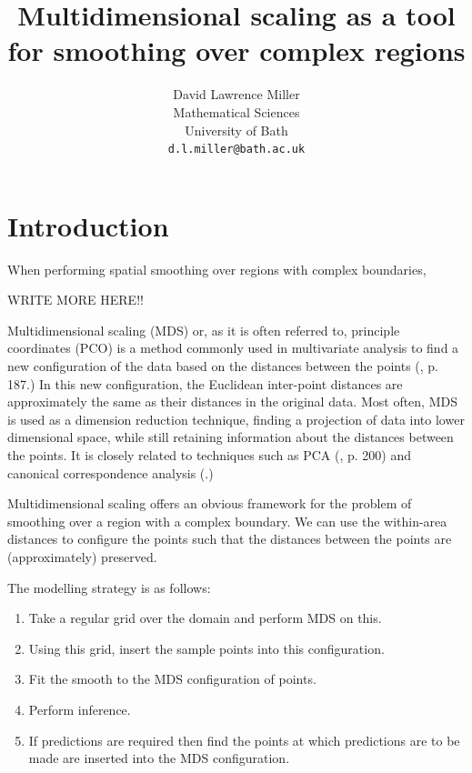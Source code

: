\documentclass[a4paper,10pt]{article}
\title{Multidimensional scaling as a tool for smoothing over complex regions}
\author{David Lawrence Miller\\Mathematical Sciences\\University of Bath\\\texttt{d.l.miller@bath.ac.uk}}
\begin{document}
 
 
 
\newtheorem{thm}{Theorem}[section]
 
\newtheorem{defn}{Definition}[section]
 
\maketitle


\section{Introduction}

When performing spatial smoothing over regions with complex boundaries, 

WRITE MORE HERE!!


Multidimensional scaling (MDS) or, as it is often referred to, principle coordinates (PCO) is a method commonly used in multivariate analysis to find a new configuration of the data based on the distances between the points (\cite{chatfieldcollins}, p. 187.) In this new configuration, the Euclidean inter-point distances are approximately the same as their distances in the original data. Most often, MDS is used as a dimension reduction technique, finding a projection of data into lower dimensional space, while still retaining information about the distances between the points. It is closely related to techniques such as PCA (\cite{chatfieldcollins}, p. 200) and canonical correspondence analysis (\cite{terbraak}.)

Multidimensional scaling offers an obvious framework for the problem of smoothing over a region with a complex boundary. We can use the within-area distances to configure the points such that the distances between the points are (approximately) preserved.

The modelling strategy is as follows:

\begin{enumerate}
\item Take a regular grid over the domain and perform MDS on this.
\item Using this grid, insert the sample points into this configuration.
\item Fit the smooth to the MDS configuration of points.
\item Perform inference.
\item If predictions are required then find the points at which predictions are to be made are inserted into the MDS configuration.
\end{enumerate}
\end{document}
